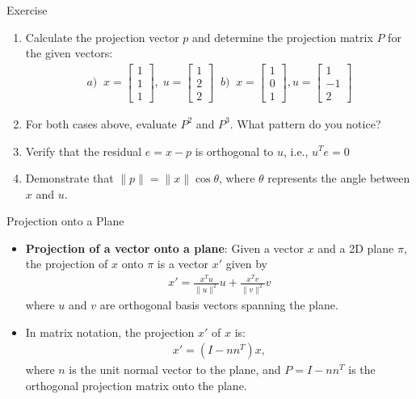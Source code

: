 \begin{frame}{Exercise}
\begin{enumerate}
    \item Calculate the projection vector $p$ and determine the projection matrix $P$ for the given vectors:
    \begin{align}
        a)\;\; x=\begin{bmatrix}
        1\\1\\1
    \end{bmatrix}, \;u=\begin{bmatrix}
        1\\2\\2
    \end{bmatrix}\;\; b) \;\;  x=\begin{bmatrix}
        1\\0\\1
    \end{bmatrix}, u=\begin{bmatrix}
        1\\-1\\2
    \end{bmatrix}
    \end{align}
    \item For both cases above, evaluate $P^2$ and $P^3$. What pattern do you notice?
    \item Verify that the residual $e=x-p$ is orthogonal to $u$, i.e., $u^Te=0$
    \item Demonstrate that $\|p\| = \|x\| \cos \theta$, where $\theta$ represents the angle between $x$ and $u$.
\end{enumerate}
\end{frame}


\begin{frame}{Projection onto a Plane}
\begin{itemize}
    \item \textbf{Projection of a vector onto a plane}: Given a vector $x$ and a 2D plane $\pi$, the projection of $x$ onto $\pi$ is a vector $x'$ given by
    \begin{align}
        x' = \frac{x^Tu}{\|u\|^2}u + \frac{x^Tv}{\|v\|^2}v
    \end{align}
    where $u$ and $v$ are orthogonal basis vectors spanning the plane.
    \item In matrix notation, the projection $x'$ of $x$ is:
    \begin{align}
        x' = \left( I - nn^T \right) x,
    \end{align}
    where $n$ is the unit normal vector to the plane, and $P = I - nn^T$ is the orthogonal projection matrix onto the plane.
\end{itemize}
\end{frame}

